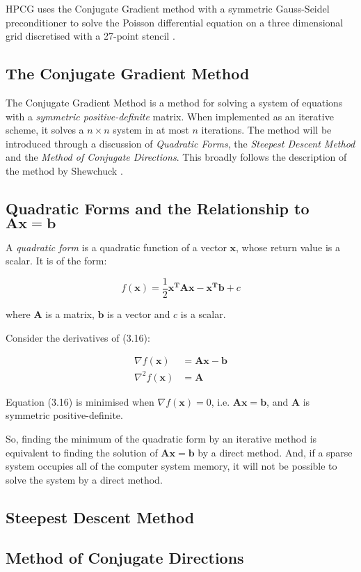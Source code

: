 HPCG uses the Conjugate Gradient method with a symmetric Gauss-Seidel preconditioner to solve the Poisson differential equation on a three dimensional grid discretised with a 27-point stencil \cite{hpcg-benchmark}.


%
%
\subsection{The Conjugate Gradient Method}

The Conjugate Gradient Method is a method for solving a system of equations with a \emph{symmetric positive-definite} matrix. When implemented as an iterative scheme, it solves a $n \times n$ system in at most $n$ iterations. The method will be introduced through a discussion of \emph{Quadratic Forms}, the \emph{Steepest Descent Method} and the \emph{Method of Conjugate Directions}. This broadly follows the description of the method by Shewchuck \cite{cg-without-pain}.
 

%
%
\subsection{Quadratic Forms and the Relationship to $\mathbf{A}\mathbf{x}=\mathbf{b}$}

A \emph{quadratic form} is a quadratic function of a vector $\mathbf{x}$, whose return value is a scalar. It is of the form:

\begin{equation}
f(\mathbf{x}) = \frac{1}{2}\mathbf{x}^{\mathbf{T}}\mathbf{A}\mathbf{x} - \mathbf{x}^{\mathbf{T}}\mathbf{b} + c
\end{equation}

where $\mathbf{A}$ is a matrix, $\mathbf{b}$ is a vector and $c$ is a scalar.

Consider the derivatives of (3.16):

\begin{equation}
\begin{split}
\nabla f(\mathbf{x}) &= \mathbf{A}\mathbf{x} - \mathbf{b} \\
\nabla^2 f(\mathbf{x}) &= \mathbf{A}
\end{split}
\end{equation}

Equation (3.16) is minimised when $\nabla f(\mathbf{x}) = 0$, i.e. $\mathbf{A}\mathbf{x} = \mathbf{b}$, and $\mathbf{A}$ is symmetric positive-definite.

So, finding the minimum of the quadratic form by an iterative method is equivalent to finding the solution of $\mathbf{A}\mathbf{x} = \mathbf{b}$ by a direct method. And, if a sparse system occupies all of the computer system memory, it will not be possible to solve the system by a direct method.


%
%
\subsection{Steepest Descent Method}


%
%
\subsection{Method of Conjugate Directions}












